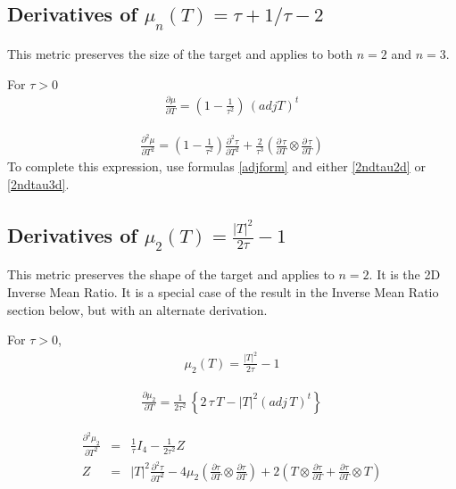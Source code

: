 \documentclass{report}
\begin{document}
\subsection{Derivatives of $\mu_n(T)=\tau + 1/\tau - 2$ \label{z+1} }

\noindent This metric preserves the size of the target and applies
to both $n=2$ and $n=3$. \newline

\noindent For $\tau>0$
\begin{eqnarray}
\frac{\partial \mu}{\partial T} = \left( 1 - \frac{1}{\tau^2} \right) \, (adj T)^t
\end{eqnarray}

\begin{eqnarray}
\frac{\partial^2 \mu}{\partial T^2} = \left( 1 - \frac{1}{\tau^2} \right) \frac{\partial^2 \tau}{\partial T^2} + \frac{2}{\tau^3} \left( \frac{\partial \, \tau}{\partial T} \otimes \frac{\partial \, \tau}{\partial T} \right)
\end{eqnarray}
To complete this expression, use formulas \ref{adjform} and either 
\ref{2ndtau2d} or \ref{2ndtau3d}. \newline

\subsection{Derivatives of $\mu_2(T) = \frac{|T|^2}{2 \tau}-1$ \label{shape+2d} }

\noindent This metric preserves the shape of the target and applies
to $n=2$. It is the 2D Inverse Mean Ratio. It is a special case of the result
in the Inverse Mean Ratio section below, but with an alternate derivation. \newline

\noindent For $\tau>0$,
\begin{eqnarray}
\mu_2(T) = \frac{|T|^2}{2 \tau} - 1
\end{eqnarray}

\begin{eqnarray}
\frac{\partial \mu_2}{\partial T} = \frac{1}{2 \tau^2} \, \left\{ 2 \, \tau \, T - |T|^2 (adj \, T)^t \right\}
\end{eqnarray}

\begin{eqnarray}
\frac{\partial^2 \mu_2}{\partial T^2} & = & \frac{1}{\tau} I_4 - \frac{1}{2 \tau^2} Z \\
Z & = & |T|^2 \frac{\partial^2 \tau}{\partial T^2} - 4 \mu_2 \left(\frac{\partial \tau}{\partial T} \otimes \frac{\partial \tau}{\partial T} \right) + 2 \left( T \otimes \frac{\partial \tau}{\partial T} + \frac{\partial \tau}{\partial T} \otimes T \right) \nonumber \\
\end{eqnarray}
\end{document}
